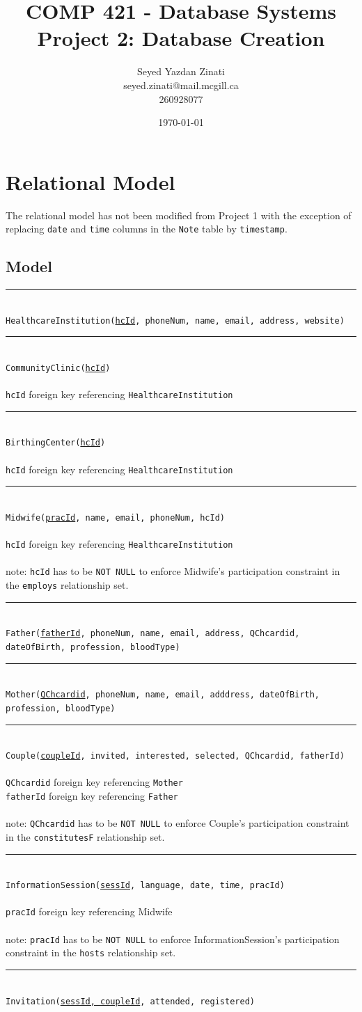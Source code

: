 \documentclass[10pt, letterpaper]{article}
\title{COMP 421 - Database Systems \\ 
\large Project 2: Database Creation}
\author{Seyed Yazdan Zinati\\seyed.zinati@mail.mcgill.ca\\ 260928077}
\date{\today}
\newcommand{\code}[1]{\texttt{#1}}
\newcommand{\dline}{\par\noindent\rule{\textwidth}{0.2pt}\\}
\begin{document}
\maketitle

\section{Relational Model}
The relational model has not been modified from Project 1 with the exception of replacing \code{date} and \code{time} columns in the \code{Note} table by \code{timestamp}.
\subsection*{Model}
\dline
\code{HealthcareInstitution(\underline{hcId}, phoneNum, name, email, address, website)}
\dline
\code{CommunityClinic(\underline{hcId})}\\
\\
\code{hcId} foreign key referencing \code{HealthcareInstitution}
\dline
\code{BirthingCenter(\underline{hcId})}\\
\\
\code{hcId} foreign key referencing \code{HealthcareInstitution}
\dline
\code{Midwife(\underline{pracId}, name, email, phoneNum, hcId)}\\
\\
\code{hcId} foreign key referencing \code{HealthcareInstitution}\\
\\
note: \code{hcId} has to be \code{NOT NULL} to enforce Midwife's participation constraint in the \code{employs} relationship set.
\dline
\code{Father(\underline{fatherId}, phoneNum, name, email, address, QChcardid, dateOfBirth, profession, bloodType)}
\dline
\code{Mother(\underline{QChcardid}, phoneNum, name, email, adddress, dateOfBirth, profession, bloodType)}
\dline
\code{Couple(\underline{coupleId}, invited, interested, selected, QChcardid, fatherId)}\\
\\
\code{QChcardid} foreign key referencing \code{Mother}\\
\code{fatherId} foreign key referencing \code{Father}\\
\\
note: \code{QChcardid} has to be \code{NOT NULL} to enforce Couple's participation constraint in the \code{constitutesF} relationship set.

\dline
\code{InformationSession(\underline{sessId}, language, date, time, pracId)}\\
\\
\code{pracId} foreign key referencing Midwife\\
\\
note: \code{pracId} has to be \code{NOT NULL} to enforce InformationSession's participation constraint in the \code{hosts} relationship set.
\dline
\code{Invitation(\underline{sessId, coupleId}, attended, registered)}\\
\end{document}
